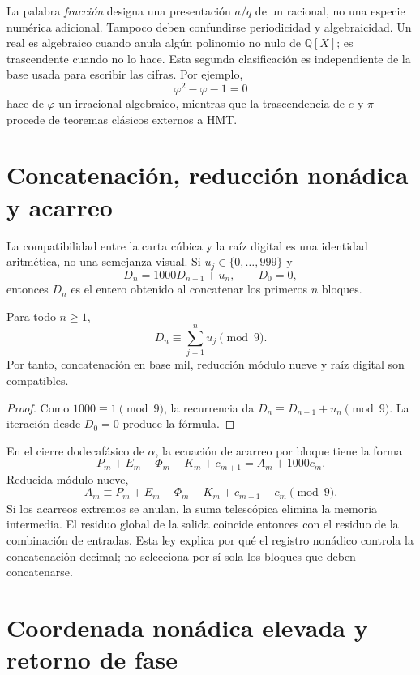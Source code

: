 La palabra \emph{fracción} designa una presentación \(a/q\) de un racional,
no una especie numérica adicional. Tampoco deben confundirse periodicidad y
algebraicidad. Un real es algebraico cuando anula algún polinomio no nulo de
\(\mathbb Q[X]\); es trascendente cuando no lo hace. Esta segunda
clasificación es independiente de la base usada para escribir las cifras.
Por ejemplo,
\[
 \varphi^2-\varphi-1=0
\]
hace de \(\varphi\) un irracional algebraico, mientras que la trascendencia
de \(e\) y \(\pi\) procede de teoremas clásicos externos a HMT\@.

\section{Concatenación, reducción nonádica y acarreo}

La compatibilidad entre la carta cúbica y la raíz digital es una identidad
aritmética, no una semejanza visual. Si \(u_j\in\{0,\ldots,999\}\) y
\[
 D_n=1000D_{n-1}+u_n,
 \qquad D_0=0,
\]
entonces \(D_n\) es el entero obtenido al concatenar los primeros \(n\)
bloques.

\begin{theorem}
\label{thm:checksum-nonadico-base-mil}
Para todo \(n\geq1\),
\[
 D_n\equiv\sum_{j=1}^n u_j\pmod9.
\]
Por tanto, concatenación en base mil, reducción módulo nueve y raíz digital
son compatibles.
\end{theorem}

\begin{proof}
Como \(1000\equiv1\pmod9\), la recurrencia da
\(D_n\equiv D_{n-1}+u_n\pmod9\). La iteración desde \(D_0=0\) produce la
fórmula.
\end{proof}

En el cierre dodecafásico de \(\alpha\), la ecuación de acarreo por bloque
tiene la forma
\[
 P_m+E_m-\Phi_m-K_m+c_{m+1}=A_m+1000c_m.
\]
Reducida módulo nueve,
\[
 A_m\equiv
 P_m+E_m-\Phi_m-K_m+c_{m+1}-c_m
 \pmod9.
\]
Si los acarreos extremos se anulan, la suma telescópica elimina la memoria
intermedia. El residuo global de la salida coincide entonces con el residuo
de la combinación de entradas. Esta ley explica por qué el registro nonádico
controla la concatenación decimal; no selecciona por sí sola los bloques que
deben concatenarse.

\section{Coordenada nonádica elevada y retorno de fase}

